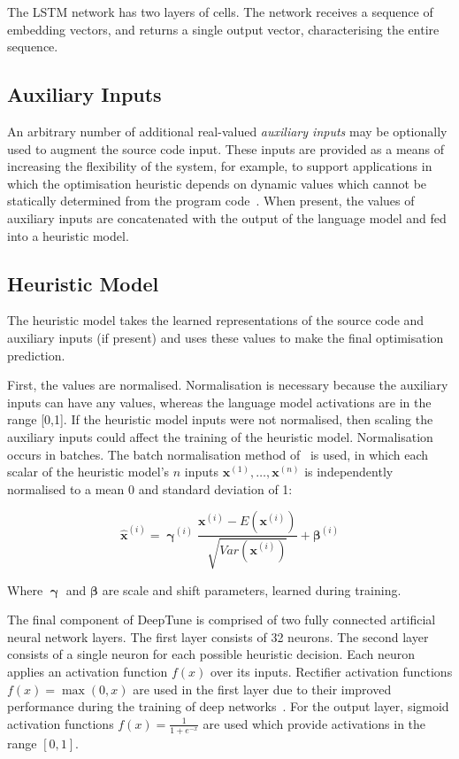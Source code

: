 The LSTM network has two layers of cells. The network receives a sequence of embedding vectors, and returns a single output vector, characterising the entire sequence.


\subsection{Auxiliary Inputs}

An arbitrary number of additional real-valued \emph{auxiliary inputs} may be optionally used to augment the source code input. These inputs are provided as a means of increasing the flexibility of the system, for example, to support applications in which the optimisation heuristic depends on dynamic values which cannot be statically determined from the program code~\cite{Ding2015,Stephenson2005}. When present, the values of auxiliary inputs are concatenated with the output of the language model and fed into a heuristic model.


\subsection{Heuristic Model}

The heuristic model takes the learned representations of the source code and auxiliary inputs (if present) and uses these values to make the final optimisation prediction.

First, the values are normalised. Normalisation is necessary because the auxiliary inputs can have any values, whereas the language model activations are in the range [0,1]. If the heuristic model inputs were not normalised, then scaling the auxiliary inputs could affect the training of the heuristic model. Normalisation occurs in batches. The batch normalisation method of~\cite{Ioffe2015a} is used, in which each scalar of the heuristic model's $n$ inputs $\bm{x}^{(1)}, \ldots, \bm{x}^{(n)}$ is independently normalised to a mean 0 and standard deviation of 1:

\begin{equation}
\bm{\hat{x}}^{(i)} = \bm{\upgamma}^{(i)} \frac{\bm{x}^{(i)} - E(\bm{x}^{(i)})}{\sqrt{Var(\bm{x}^{(i)})}} + \bm{\beta}^{(i)}
\end{equation}

Where $\bm{\upgamma}$ and $\bm{\beta}$ are scale and shift parameters, learned during training.

The final component of DeepTune is comprised of two fully connected artificial neural network layers. The first layer consists of 32 neurons. The second layer consists of a single neuron for each possible heuristic decision. Each neuron applies an activation function $f(x)$ over its inputs. Rectifier activation functions $f(x) = \max(0, x)$ are used in the first layer due to their improved performance during the training of deep networks~\cite{Nair2010}. For the output layer, sigmoid activation functions $f(x) = \frac{1}{1+e^{-x}}$ are used which provide activations in the range $[0,1]$.

